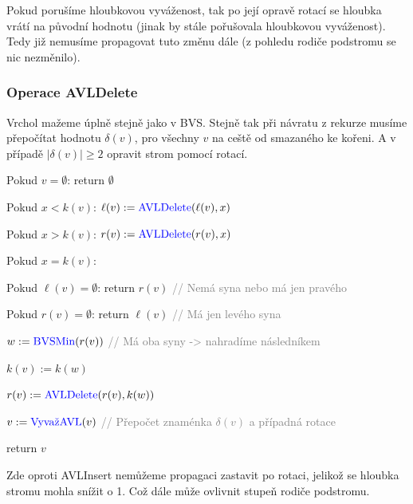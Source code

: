\bigskip

\noindent Pokud porušíme hloubkovou vyváženost, tak po její opravě rotací se hloubka vrátí na původní hodnotu (jinak by stále pořušovala hloubkovou vyváženost). Tedy již nemusíme propagovat tuto změnu dále (z pohledu rodiče podstromu se nic nezměnilo).

\subsubsection{Operace AVLDelete}

Vrchol mažeme úplně stejně jako v BVS. Stejně tak při návratu z rekurze musíme přepočítat hodnotu $\delta(v)$, pro všechny $v$ na ceště od smazaného ke kořeni. A v případě $|\delta(v)| \geq 2$ opravit strom pomocí rotací. 

\bigskip
{}
\begin{pseudocode}
\item Pokud $v = \emptyset$: return $\emptyset$
\item Pokud $x < k(v)$: $\ell(v) := \text{\textcolor{blue}{AVLDelete}}(\ell(v), x)$
\item Pokud $x > k(v)$: $r(v) := \text{\textcolor{blue}{AVLDelete}}(r(v), x)$
\item Pokud $x = k(v)$:
\item \tab Pokud $\ell(v) = \emptyset$: return $r(v)$ \textcolor{gray}{// Nemá syna nebo má jen pravého}
\item \tab Pokud $r(v) = \emptyset$: return $\ell(v)$ \textcolor{gray}{// Má jen levého syna}
\item \tab $w := \text{\textcolor{blue}{BVSMin}}(r(v))$ \textcolor{gray}{// Má oba syny -> nahradíme následníkem}
\item \tab $k(v) := k(w)$
\item \tab $r(v) := \text{\textcolor{blue}{AVLDelete}}(r(v), k(w))$
\item $v := \text{\textcolor{blue}{VyvažAVL}}(v)$ \textcolor{gray}{// Přepočet znaménka $\delta(v)$ a případná rotace}
\item return $v$
\end{pseudocode}

\bigskip

\noindent Zde oproti AVLInsert nemůžeme propagaci zastavit po rotaci, jelikož se hloubka stromu mohla snížit o 1. Což dále může ovlivnit stupeň rodiče podstromu.

